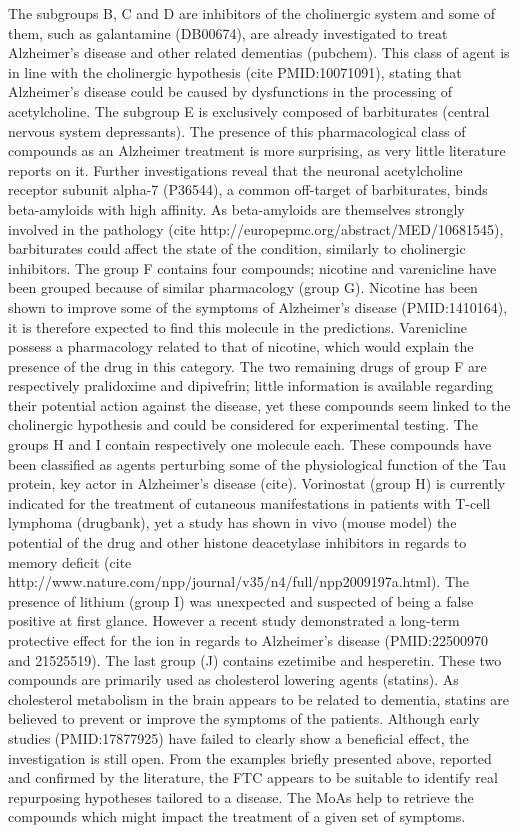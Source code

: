 \documentclass{bioinfo}
\begin{document}
The subgroups B, C and D are inhibitors of the cholinergic system and some of them, such as galantamine (DB00674), are already 
investigated to treat Alzheimer’s disease and other related dementias (pubchem). This class of agent is in line with the 
cholinergic hypothesis (cite PMID:10071091), stating that Alzheimer’s disease could be caused by dysfunctions in the processing of acetylcholine. The subgroup E is exclusively composed of barbiturates (central nervous system depressants). The presence of this pharmacological class of compounds as an Alzheimer treatment is more surprising, as very little literature reports on it. Further investigations reveal that the neuronal acetylcholine receptor subunit alpha-7 (P36544), a common off-target of barbiturates, binds beta-amyloids with high affinity. As beta-amyloids are themselves strongly involved in the pathology (cite http://europepmc.org/abstract/MED/10681545), barbiturates could affect the state of the condition, similarly to cholinergic inhibitors.
The group F contains four compounds; nicotine and varenicline have been grouped because of similar pharmacology (group G). 
Nicotine has been shown to improve some of the symptoms of Alzheimer’s disease (PMID:1410164), it is therefore expected to 
find this molecule in the predictions. Varenicline possess a pharmacology related to that of nicotine, which would explain 
the presence of the drug in this category. The two remaining drugs of group F are respectively pralidoxime and dipivefrin; 
little information is available regarding their potential action against the disease, yet these compounds seem linked to the 
cholinergic hypothesis and could be considered for experimental testing.
The groups H and I contain respectively one molecule each. These compounds have been classified as agents perturbing some of 
the physiological function of the Tau protein, key actor in Alzheimer's disease (cite). Vorinostat (group H) is currently 
indicated for the treatment of cutaneous manifestations in patients with T-cell lymphoma (drugbank), yet a study has 
shown in vivo (mouse model) the potential of the drug and other histone deacetylase inhibitors in regards to memory 
deficit (cite http://www.nature.com/npp/journal/v35/n4/full/npp2009197a.html). The presence of lithium (group I) was 
unexpected and suspected of being a false positive at first glance. However a recent study demonstrated a long-term 
protective effect for the ion in regards to Alzheimer’s disease (PMID:22500970 and 21525519). The last group (J) contains 
ezetimibe and hesperetin. These two compounds are primarily used as cholesterol lowering agents (statins). As cholesterol 
metabolism in the brain appears to be related to dementia, statins are believed to prevent or improve the symptoms of the 
patients. Although early studies (PMID:17877925) have failed to clearly show a beneficial effect, the investigation is still open.
From the examples briefly presented above, reported and confirmed by the literature, the FTC appears to be suitable to 
identify real repurposing hypotheses tailored to a disease. The MoAs help to retrieve the compounds which might impact 
the treatment of a given set of symptoms.
\end{document}
